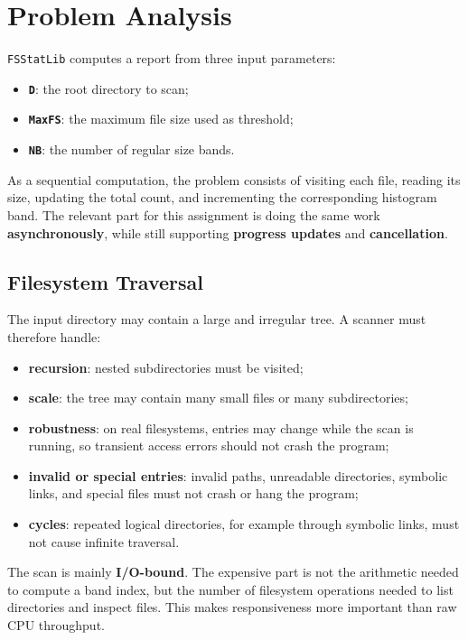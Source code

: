\clearpage
\section{Problem Analysis}

\texttt{FSStatLib} computes a report from three input parameters:

\begin{itemize}
  \item \textbf{\texttt{D}}: the root directory to scan;
  \item \textbf{\texttt{MaxFS}}: the maximum file size used as threshold;
  \item \textbf{\texttt{NB}}: the number of regular size bands.
\end{itemize}

As a sequential computation, the problem consists of visiting each file,
reading its size, updating the total count, and incrementing the corresponding
histogram band.
The relevant part for this assignment is doing the same work
\textbf{asynchronously}, while still supporting \textbf{progress updates} and
\textbf{cancellation}.

\subsection{Filesystem Traversal}

The input directory may contain a large and irregular tree. A scanner must
therefore handle:

\begin{itemize}
  \item \textbf{recursion}: nested subdirectories must be visited;
  \item \textbf{scale}: the tree may contain many small files or many
  subdirectories;
  \item \textbf{robustness}: on real filesystems, entries may change while the
  scan is running, so transient access errors should not crash the program;
  \item \textbf{invalid or special entries}: invalid paths, unreadable
  directories, symbolic links, and special files must not crash or hang the
  program;
  \item \textbf{cycles}: repeated logical directories, for example through
  symbolic links, must not cause infinite traversal.
\end{itemize}

The scan is mainly \textbf{I/O-bound}. The expensive part is not the arithmetic
needed to compute a band index, but the number of filesystem operations needed
to list directories and inspect files. This makes responsiveness more important
than raw CPU throughput.

